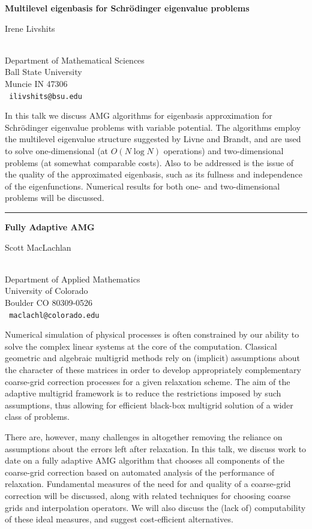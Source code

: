 \documentclass[twosided]{report}
\begin{document}
\begin{center}
{\large			\label{livshits}
{\bf
Multilevel eigenbasis for Schr\"{o}dinger eigenvalue problems
}

Irene Livshits} \\
Department of Mathematical Sciences \\
Ball State University \\
Muncie IN 47306
\\ {\tt
ilivshits@bsu.edu
}
\end{center}

In this talk we discuss AMG algorithms for eigenbasis approximation for
Schr\"{o}dinger eigenvalue problems with variable potential. The algorithms
employ the multilevel eigenvalue structure suggested by Livne and
Brandt, and are used to solve one-dimensional
(at $O(N\log N)$ operations)
and two-dimensional problems (at somewhat comparable costs). Also to be
addressed is the issue of the quality of the approximated eigenbasis,
such as its fullness and independence of the eigenfunctions. Numerical
results for both one- and two-dimensional problems will be discussed.

\begin{center}

\rule{6in}{1pt}
\end{center}

\begin{center}
{\large			\label{maclachlan}
{\bf
Fully Adaptive AMG
}

Scott MacLachlan} \\
Department of Applied Mathematics \\
University of Colorado \\
Boulder CO 80309-0526
\\ {\tt
maclachl@colorado.edu
}
\end{center}

Numerical simulation of physical processes is often constrained by our
ability to solve the complex linear systems at the core of the
computation. Classical geometric and algebraic multigrid methods rely
on (implicit) assumptions about the character of these matrices in
order to develop appropriately complementary coarse-grid correction
processes for a given relaxation scheme. The aim of the adaptive
multigrid framework is to reduce the restrictions imposed by such
assumptions, thus allowing for efficient black-box multigrid solution
of a wider class of problems.

There are, however, many challenges in altogether removing the reliance
on assumptions about the errors left after relaxation. In this talk, we
discuss work to date on a fully adaptive AMG algorithm that chooses all
components of the coarse-grid correction based on automated analysis of
the performance of relaxation. Fundamental measures of the need for and
quality of a coarse-grid correction will be discussed, along with
related techniques for choosing coarse grids and interpolation
operators. We will also discuss the (lack of) computability of these
ideal measures, and suggest cost-efficient alternatives.
\end{document}
